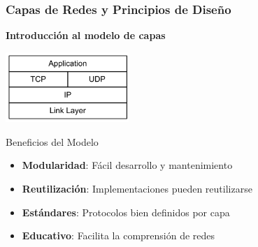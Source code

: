 \documentclass[aspectratio=169]{beamer}
\begin{document}
\begin{frame}
\frametitle{Capas de Redes y Principios de Diseño}

\begin{center}
\Large \textbf{Introducción al modelo de capas}
\end{center}

\begin{center}
\includegraphics[width=0.35\textwidth]{figuras/tcpsobreip.png}
\end{center}

\begin{block}{Beneficios del Modelo}
\begin{itemize}
\item<1-> \textbf{Modularidad}: Fácil desarrollo y mantenimiento
\item<2-> \textbf{Reutilización}: Implementaciones pueden reutilizarse
\item<3-> \textbf{Estándares}: Protocolos bien definidos por capa
\item<4-> \textbf{Educativo}: Facilita la comprensión de redes
\end{itemize}
\end{block}
\end{frame}
\end{document}
